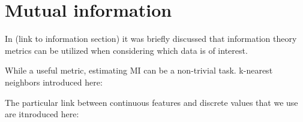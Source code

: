 \section{Mutual information}

In (link to information section) it was briefly discussed that information theory metrics can be utilized when considering which data is of interest. 

While a useful metric, estimating MI can be a non-trivial task. k-nearest neighbors introduced here:
\citep{kraskov_stögbauer_grassberger_2004}

The particular link between continuous features and discrete values that we use are itnroduced  here:
\citep{ross_2014}
